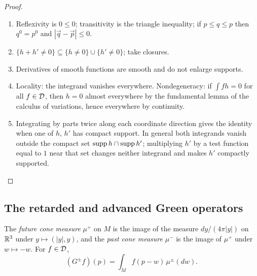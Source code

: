 \begin{proof}
\begin{enumerate}[leftmargin=2.5em]
\item[(a)] Reflexivity is $0\leq0$; transitivity is the triangle inequality; if $p\leq q\leq p$ then
$q^0=p^0$ and $|\vec q-\vec p|\le0$.
\item[(b)] $\{h+h'\neq0\}\subseteq\{h\neq0\}\cup\{h'\neq0\}$; take closures.
\item[(c)] Derivatives of smooth functions are smooth and do not enlarge supports.
\item[(d)] Locality: the integrand vanishes everywhere. Nondegeneracy: if $\int fh=0$ for all
$f\in\mathcal D$, then $h=0$ almost everywhere by the fundamental lemma of the calculus of variations, hence
everywhere by continuity.
\item[(e)] Integrating by parts twice along each coordinate direction gives the identity when one of
$h$, $h'$ has compact support. In general both integrands vanish outside the compact set
$\operatorname{supp} h\cap\operatorname{supp} h'$; multiplying $h'$ by a test function equal to $1$ near that set changes neither
integrand and makes $h'$ compactly supported.
\end{enumerate}
\end{proof}

\subsection{The retarded and advanced Green operators}

\begin{definition}\label{def:kirchhoff}
The \emph{future cone measure} $\mu^+$ on $M$ is the image of the measure $dy/(4\pi|y|)$ on $\mathbb R^3$
under $y\mapsto(|y|,y)$, and the \emph{past cone measure} $\mu^-$ is the image of $\mu^+$ under
$w\mapsto-w$. For $f\in\mathcal D$,
\[
(G^\pm f)(p)=\int_Mf(p-w)\,\mu^\pm(dw).
\]
\end{definition}

